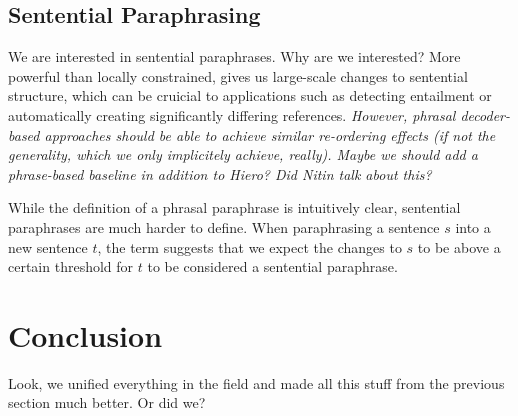 \documentclass[11pt]{article}
\begin{document}
\subsection{Sentential Paraphrasing} \label{sentential_paraphrasing}

We are interested in sentential paraphrases. Why are we interested?
More powerful than locally constrained, gives us large-scale changes
to sentential structure, which can be cruicial to applications such as
detecting entailment or automatically creating significantly differing
references. \emph{However, phrasal decoder-based approaches should be
  able to achieve similar re-ordering effects (if not the generality,
  which we only implicitely achieve, really). Maybe we should add a
  phrase-based baseline in addition to Hiero? Did Nitin talk about
  this?}

While the definition of a phrasal paraphrase is intuitively clear,
sentential paraphrases are much harder to define. When paraphrasing a
sentence $s$ into a new sentence $t$, the term suggests that we expect
the changes to $s$ to be above a certain threshold for $t$ to be
considered a sentential paraphrase. 

\section{Conclusion} \label{conclusion}

Look, we unified everything in the field and made all this stuff from
the previous section much better. Or did we?




\nocite{*}
\end{document}
